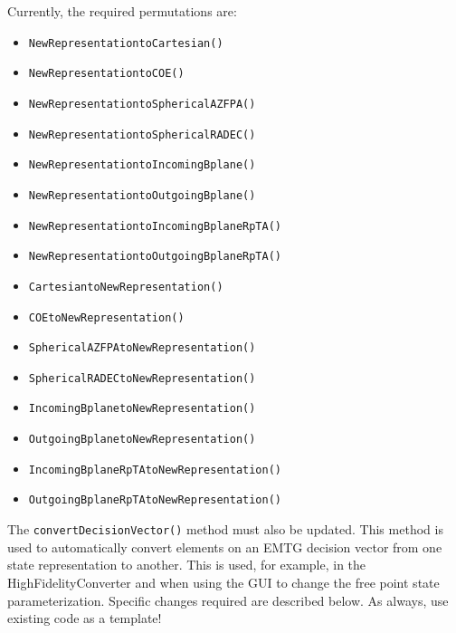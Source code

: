\documentclass[11pt]{article}
\begin{document}
Currently, the required permutations are:

\begin{itemize}
	\item \texttt{NewRepresentationtoCartesian()}
	\item \texttt{NewRepresentationtoCOE()}
	\item \texttt{NewRepresentationtoSphericalAZFPA()}
	\item \texttt{NewRepresentationtoSphericalRADEC()}
	\item \texttt{NewRepresentationtoIncomingBplane()}
	\item \texttt{NewRepresentationtoOutgoingBplane()}
	\item \texttt{NewRepresentationtoIncomingBplaneRpTA()}
	\item \texttt{NewRepresentationtoOutgoingBplaneRpTA()}
	\item \texttt{CartesiantoNewRepresentation()}
	\item \texttt{COEtoNewRepresentation()}
	\item \texttt{SphericalAZFPAtoNewRepresentation()}
	\item \texttt{SphericalRADECtoNewRepresentation()}
	\item \texttt{IncomingBplanetoNewRepresentation()}
	\item \texttt{OutgoingBplanetoNewRepresentation()}
	\item \texttt{IncomingBplaneRpTAtoNewRepresentation()}
	\item \texttt{OutgoingBplaneRpTAtoNewRepresentation()}
\end{itemize}

The \texttt{convertDecisionVector()} method must also be updated. This method is used to automatically convert elements on an \ac{EMTG} decision vector from one state representation to another. This is used, for example, in the HighFidelityConverter and when using the GUI to change the free point state parameterization. Specific changes required are described below. As always, use existing code as a template!
\end{document}
